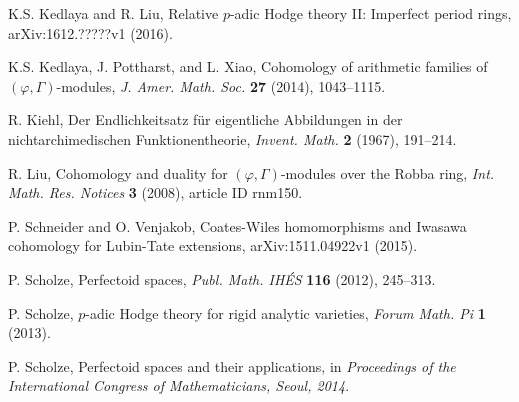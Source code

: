 \documentclass[12pt]{amsart}
\theoremstyle{definition}
\numberwithin{equation}{theorem}
\begin{document}
\begin{thebibliography}{99}
K.S. Kedlaya and R. Liu, Relative $p$-adic Hodge theory II: Imperfect period rings,
arXiv:1612.?????v1 (2016).

K.S. Kedlaya, J. Pottharst, and L. Xiao, Cohomology of arithmetic families of $(\varphi, \Gamma)$-modules, \textit{J. Amer. Math. Soc.}  \textbf{27} (2014), 1043--1115. 

R. Kiehl, Der Endlichkeitsatz f\"ur eigentliche Abbildungen
in der nichtarchimedischen Funktionentheorie,
\textit{Invent. Math.} \textbf{2} (1967), 191--214.

R. Liu, Cohomology and duality for $(\varphi, \Gamma)$-modules over the Robba ring,
\textit{Int. Math. Res. Notices} \textbf{3} (2008), article ID rnm150.

P. Schneider and O. Venjakob, Coates-Wiles homomorphisms and Iwasawa cohomology for Lubin-Tate extensions, arXiv:1511.04922v1 (2015).

P. Scholze, Perfectoid spaces, \textit{Publ. Math. IH\'ES} \textbf{116} (2012), 245--313.

P. Scholze, $p$-adic Hodge theory for rigid analytic varieties, \textit{Forum Math. Pi} \textbf{1} (2013).

P. Scholze, Perfectoid spaces and their applications, in \textit{Proceedings of the
International Congress of Mathematicians, Seoul, 2014}.

\end{thebibliography}
\end{document}
